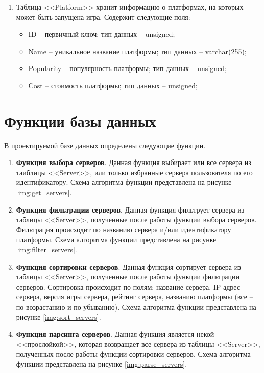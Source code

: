 \begin{enumerate}
        \item Таблица <<Platform>> хранит информацию о платформах, на которых может быть запущена игра. Содержит следующие поля:
        \begin{itemize}
            \item ID -- первичный ключ; тип данных -- unsigned;
            \item Name -- уникальное название платформы; тип данных -- varchar(255);
            \item Popularity -- популярность платформы; тип данных -- unsigned;
            \item Cost -- стоимость платформы; тип данных -- unsigned;
        \end{itemize}
\end{enumerate}


\section{Функции базы данных} \label{functions}

В проектируемой базе данных определены следующие функции.

\begin{enumerate}
    \item \textbf{Функция выбора серверов}. Данная функция выбирает или все сервера из таиблицы <<Server>>, или только избранные сервера пользователя по его идентификатору. Схема алгоритма функции представлена на рисунке \ref{img:get_servers}.

    \item \textbf{Функция фильтрации серверов}. Данная функция фильтрует сервера из таблицы <<Server>>, полученные после работы функции выбора серверов. Фильтрация происходит по названию сервера и/или идентификатору платформы. Схема алгоритма функции представлена на рисунке \ref{img:filter_servers}.

    \item \textbf{Функция сортировки серверов}. Данная функция сортирует сервера из таблицы <<Server>>, полученные после работы функции фильтрации серверов. Сортировка происходит по полям: название сервера, IP-адрес сервера, версия игры сервера, рейтинг сервера, названию платформы (все -- по возрастанию и по убыванию). Схема алгоритма функции представлена на рисунке \ref{img:sort_servers}.

    \item \textbf{Функция парсинга серверов}. Данная функция является некой <<прослойкой>>, которая возвращает все сервера из таблицы <<Server>>, полученных после работы функции сортировки серверов. Схема алгоритма функции представлена на рисунке \ref{img:parse_servers}.
\end{enumerate}

